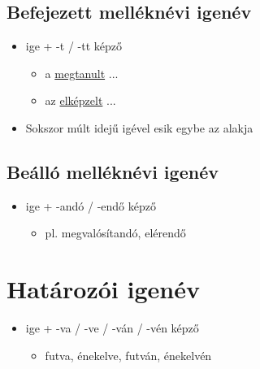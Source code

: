 \documentclass{article}
\begin{document}
\subsection{Befejezett melléknévi igenév}
\begin{itemize}
    \item ige + -t / -tt képző
    \begin{itemize}
        \item a \underline{megtanult} ...
        \item az \underline{elképzelt} ...
    \end{itemize}
    \item Sokszor múlt idejű igével esik egybe az alakja
\end{itemize}
\subsection{Beálló melléknévi igenév}
\begin{itemize}
    \item ige + -andó / -endő képző
    \begin{itemize}
        \item pl. megvalósítandó, elérendő
    \end{itemize}
\end{itemize}

\section{Határozói igenév}
\begin{itemize}
    \item ige + -va / -ve / -ván / -vén képző
    \begin{itemize}
        \item futva, énekelve, futván, énekelvén
    \end{itemize}
\end{itemize}
\end{document}
